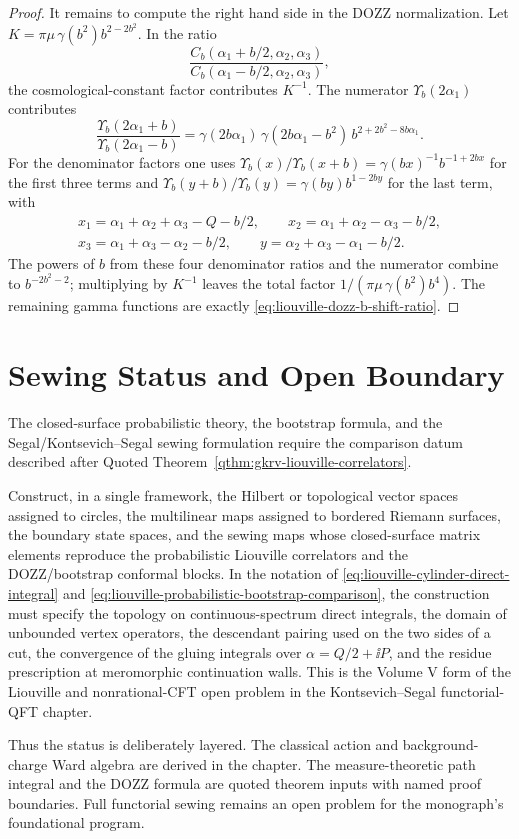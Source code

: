 \begin{proof}
It remains to compute the right hand side in the DOZZ normalization.  Let
\(K=\pi\mu\,\gamma(b^2)b^{2-2b^2}\).  In the ratio
\[
  \frac{
    C_b(\alpha_1+b/2,\alpha_2,\alpha_3)
  }{
    C_b(\alpha_1-b/2,\alpha_2,\alpha_3)
  },
\]
the cosmological-constant factor contributes \(K^{-1}\).  The numerator
\(\Upsilon_b(2\alpha_1)\) contributes
\[
  \frac{\Upsilon_b(2\alpha_1+b)}
       {\Upsilon_b(2\alpha_1-b)}
  =
  \gamma(2b\alpha_1)\,
  \gamma(2b\alpha_1-b^2)\,
  b^{2+2b^2-8b\alpha_1}.
\]
For the denominator factors one uses
\(\Upsilon_b(x)/\Upsilon_b(x+b)=
\gamma(bx)^{-1}b^{-1+2bx}\) for the first three terms and
\(\Upsilon_b(y+b)/\Upsilon_b(y)=\gamma(by)b^{1-2by}\) for the last term,
with
\[
\begin{gathered}
  x_1=\alpha_1+\alpha_2+\alpha_3-Q-b/2,\qquad
  x_2=\alpha_1+\alpha_2-\alpha_3-b/2,\\
  x_3=\alpha_1+\alpha_3-\alpha_2-b/2,\qquad
  y=\alpha_2+\alpha_3-\alpha_1-b/2 .
\end{gathered}
\]
The powers of \(b\) from these four denominator ratios and the numerator
combine to \(b^{-2b^2-2}\); multiplying by \(K^{-1}\) leaves the total
factor \(1/(\pi\mu\,\gamma(b^2)b^4)\).  The remaining gamma functions are
exactly \eqref{eq:liouville-dozz-b-shift-ratio}.
\end{proof}

\section{Sewing Status and Open Boundary}

The closed-surface probabilistic theory, the bootstrap formula, and the
Segal/Kontsevich--Segal sewing formulation require the comparison datum
described after Quoted Theorem~\ref{qthm:gkrv-liouville-correlators}.

\begin{openproblem}
\label{op:liouville-functorial-closure-volume-v}
Construct, in a single framework, the Hilbert or topological vector spaces
assigned to circles, the multilinear maps assigned to bordered Riemann
surfaces, the boundary state spaces, and the sewing maps whose closed-surface
matrix elements reproduce the probabilistic Liouville correlators and the
DOZZ/bootstrap conformal blocks.  In the notation of
\eqref{eq:liouville-cylinder-direct-integral} and
\eqref{eq:liouville-probabilistic-bootstrap-comparison}, the construction
must specify the topology on continuous-spectrum direct integrals, the domain
of unbounded vertex operators, the descendant pairing used on the two sides
of a cut, the convergence of the gluing integrals over
\(\alpha=Q/2+\ii P\), and the residue prescription at meromorphic
continuation walls.  This is the Volume V form of
the Liouville and nonrational-CFT open problem in the
Kontsevich--Segal functorial-QFT chapter.
\end{openproblem}

Thus the status is deliberately layered.  The classical action and
background-charge Ward algebra are derived in the chapter.  The
measure-theoretic path integral and the DOZZ formula are quoted theorem
inputs with named proof boundaries.  Full functorial sewing remains an open
problem for the monograph's foundational program.
